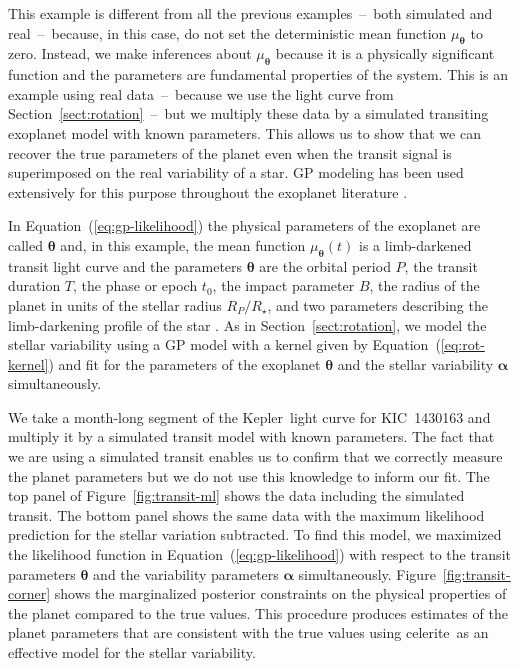 \documentclass[manuscript, letterpaper]{aastex6}
\newcommand{\project}[1]{\textsf{#1}}
\newcommand{\kepler}{\project{Kepler}}
\newcommand{\celerite}{\project{celerite}}
\newcommand{\figureref}[1]{\ref{fig:#1}}
\newcommand{\Figure}[1]{Figure~\figureref{#1}}
\renewcommand{\eqref}[1]{\ref{eq:#1}}
\newcommand{\Eq}[1]{Equation~(\eqref{#1})}
\newcommand{\eq}[1]{\Eq{#1}}
\newcommand{\sectionname}{Section}
\newcommand{\sectref}[1]{\ref{sect:#1}}
\newcommand{\Sect}[1]{\sectionname~\sectref{#1}}
\newcommand{\sect}[1]{\Sect{#1}}
\newcommand{\bvec}[1]{{\ensuremath{\boldsymbol{#1}}}}
\newcommand{\response}[1]{{\color{blue}#1}}
\begin{document}
\response{
This example is different from all the previous examples~--~both simulated and
real~--~because, in this case, do not set the deterministic
mean function $\mu_\bvec{\theta}$ to zero.
Instead, we make inferences about $\mu_\bvec{\theta}$ because it is a
physically significant function and the parameters are fundamental properties
of the system.
This is an example using real data~--~because we use the light curve from
\sect{rotation}~--~but we multiply these data by a simulated transiting
exoplanet model with known parameters.
This allows us to show that we can recover the true parameters of the planet
even when the transit signal is superimposed on the real variability of a
star.
}
GP modeling has been used extensively for this purpose throughout the
exoplanet literature \citep[for example][]{Dawson:2014, Barclay:2015,
Evans:2015, Foreman-Mackey:2016b, Grunblatt:2016}.

In \eq{gp-likelihood} the physical parameters of the exoplanet are called
$\bvec{\theta}$ and, in this example, the mean function $\mu_\bvec{\theta}(t)$
is a limb-darkened transit light curve \citep{Mandel:2002} and the parameters
$\bvec{\theta}$ are the orbital period $P$, the transit duration $T$, the
phase or epoch $t_0$, the impact parameter $B$, the radius of the planet in
units of the stellar radius $R_P/R_\star$, and two parameters describing
the limb-darkening profile of the star \citep{Claret:2011,Kipping:2013}.
As in \sect{rotation}, we model the stellar variability using a GP model
with a kernel given by \eq{rot-kernel} and fit for the parameters of the
exoplanet $\bvec{\theta}$ and the stellar variability $\bvec{\alpha}$
simultaneously.

We take a month-long segment of the \kepler\ light curve for KIC~1430163 and
multiply it by a simulated transit model with known parameters.
The fact that we are using a simulated transit enables us to confirm that we
correctly measure the planet parameters but we do not use this knowledge to
inform our fit.
The top panel of \Figure{transit-ml} shows the data including the simulated
transit.
The bottom panel shows the same data with the maximum likelihood prediction
for the stellar variation subtracted.
To find this model, we maximized the likelihood function in \eq{gp-likelihood}
with respect to the transit parameters $\bvec{\theta}$ and the variability
parameters $\bvec{\alpha}$ simultaneously.
\Figure{transit-corner} shows the marginalized posterior constraints on the
physical properties of the planet compared to the true values.
This procedure produces estimates of the planet parameters that are consistent
with the true values using \celerite\ as an effective model for the stellar
variability.
\end{document}

